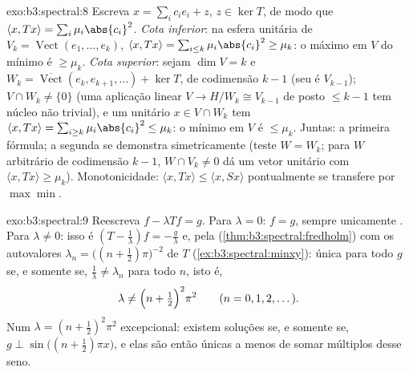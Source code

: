 \begin{solution}{exo:b3:spectral:8}
Escreva $x = \sum_ic_ie_i + z$, $z \in \ker T$, de modo que $\langle x,
Tx\rangle = \sum_i\mu_i\abs{c_i}^2$. \emph{Cota inferior}: na
esfera unitária de $V_k = \operatorname{Vect}(e_1, \dots,
e_k)$, $\langle x, Tx\rangle = \sum_{i\leq
k}\mu_i\abs{c_i}^2 \geq \mu_k$: o máximo em $V$ do mínimo
é $\geq \mu_k$. \emph{Cota superior}: sejam $\dim V = k$ e $W_k
= \overline{\operatorname{Vect}}(e_k, e_{k+1}, \dots) +
\ker T$, de codimensão $k - 1$ (seu  é
$V_{k-1}$); $V \cap W_k \neq \{0\}$ (uma aplicação linear $V \to
H/W_k \cong V_{k-1}$ de posto $\leq k - 1$ tem núcleo
não trivial), e um unitário $x \in V\cap W_k$ tem $\langle x,
Tx\rangle = \sum_{i \geq k}\mu_i\abs{c_i}^2 \leq \mu_k$: o
mínimo em $V$ é $\leq \mu_k$. Juntas: a primeira fórmula;
a segunda se demonstra simetricamente (teste $W = W_k$; para
$W$ arbitrário de codimensão $k-1$, $W \cap V_k \neq 0$ dá
um vetor unitário com $\langle x, Tx\rangle \geq \mu_k$).
Monotonicidade: $\langle x, Tx\rangle \leq \langle x,
Sx\rangle$ pontualmente se transfere por $\max\min$.
\end{solution}

\begin{solution}{exo:b3:spectral:9}
Reescreva $f - \lambda Tf = g$. Para $\lambda = 0$: $f = g$,
sempre unicamente . Para $\lambda \neq 0$: isso é
$(T - \frac1\lambda)f = -\frac g\lambda$ e, pela  (\cref{thm:b3:spectral:fredholm}) com os
autovalores $\lambda_n = \bigl((n + \frac12)\pi\bigr)^{-2}$ de
$T$ (\cref{ex:b3:spectral:minxy}):  única para todo
$g$ se, e somente se, $\frac1\lambda \neq \lambda_n$ para todo $n$, isto é,
\[
\lambda \neq \Bigl(n + \tfrac12\Bigr)^2\pi^2
\qquad (n = 0, 1, 2, \dots).
\]
Num $\lambda = (n+\frac12)^2\pi^2$ excepcional: existem soluções
se, e somente se, $g \perp \sin\bigl((n{+}\frac12)\pi x\bigr)$, e elas são então únicas a menos de somar múltiplos desse seno.
\end{solution}

